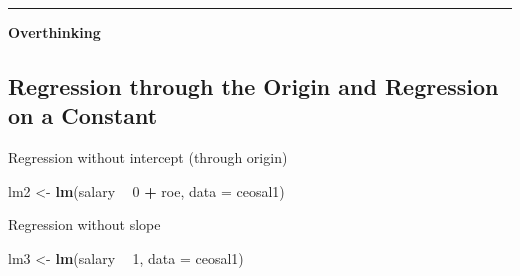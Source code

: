 \documentclass[]{book}
\newenvironment{Shaded}{\begin{snugshade}}{\end{snugshade}}
\newcommand{\DataTypeTok}[1]{\textcolor[rgb]{0.13,0.29,0.53}{#1}}
\newcommand{\DecValTok}[1]{\textcolor[rgb]{0.00,0.00,0.81}{#1}}
\newcommand{\KeywordTok}[1]{\textcolor[rgb]{0.13,0.29,0.53}{\textbf{#1}}}
\newcommand{\NormalTok}[1]{#1}
\newcommand{\OperatorTok}[1]{\textcolor[rgb]{0.81,0.36,0.00}{\textbf{#1}}}
\newcommand{\StringTok}[1]{\textcolor[rgb]{0.31,0.60,0.02}{#1}}
\begin{document}
\begin{center}\rule{0.5\linewidth}{\linethickness}\end{center}

\textbf{Overthinking}

\hypertarget{regression-through-the-origin-and-regression-on-a-constant}{%
\subsection{Regression through the Origin and Regression on a
Constant}\label{regression-through-the-origin-and-regression-on-a-constant}}

Regression without intercept (through origin)

\begin{Shaded}
\begin{Highlighting}[]
\NormalTok{lm2 <-}\StringTok{ }\KeywordTok{lm}\NormalTok{(salary }\OperatorTok{~}\StringTok{  }\DecValTok{0} \OperatorTok{+}\StringTok{ }\NormalTok{roe, }\DataTypeTok{data =}\NormalTok{ ceosal1)}
\end{Highlighting}
\end{Shaded}

Regression without slope

\begin{Shaded}
\begin{Highlighting}[]
\NormalTok{lm3 <-}\StringTok{ }\KeywordTok{lm}\NormalTok{(salary }\OperatorTok{~}\StringTok{ }\DecValTok{1}\NormalTok{, }\DataTypeTok{data =}\NormalTok{ ceosal1)}
\end{Highlighting}
\end{Shaded}
\end{document}
